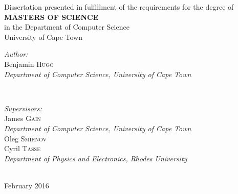 \begin{titlepage}
\begin{center}
 {\large Dissertation presented in fulfillment of the requirements for the degree of} \\
 {\large \textbf{MASTERS OF SCIENCE}} \\
 {\large in the Department of Computer Science} \\
 {\large University of Cape Town}
\end{center}
\vspace{0.15\textheight}
\begin{minipage}{0.4\textwidth}
\begin{flushleft} \large
\emph{Author:} \\
Benjamin \textsc{Hugo} \\
{\small \textit{Department of Computer Science, University of Cape Town}}\\
\end{flushleft}
\end{minipage}
~
\begin{minipage}{0.4\textwidth}
\begin{flushright} \large
\emph{Supervisors:} \\
James \textsc{Gain} \\
{\small \textit{Department of Computer Science, University of Cape Town}}\\
Oleg \textsc{Smirnov} \\
Cyril \textsc{Tasse} \\
{\small \textit{Department of Physics and Electronics, Rhodes University}}
\end{flushright}
\end{minipage}\\[3cm]


{\large February 2016}\\[1.5cm] %

\vfill %

\end{titlepage}

